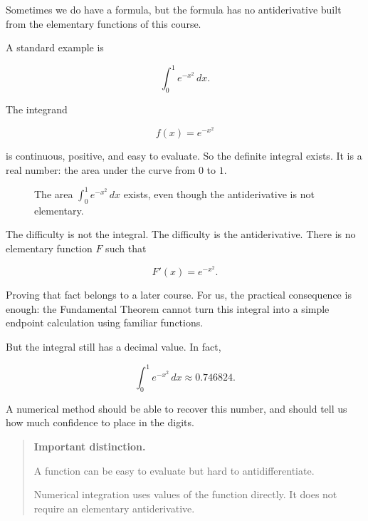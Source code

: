 Sometimes we do have a formula, but the formula has no antiderivative built from the
elementary functions of this course.

A standard example is

\[
\int_0^1 e^{-x^2}\,dx.
\]

The integrand

\[
f(x)=e^{-x^2}
\]

is continuous, positive, and easy to evaluate.  So the definite integral exists.  It is a
real number: the area under the curve from \(0\) to \(1\).

\begin{figure}[h]
\centering
{}
\caption{The area \(\int_0^1 e^{-x^2}\,dx\) exists, even though the antiderivative is not elementary.}
\label{fig:gaussian-integral-piece}
\end{figure}

The difficulty is not the integral.  The difficulty is the antiderivative.  There is no
elementary function \(F\) such that

\[
F'(x)=e^{-x^2}.
\]

Proving that fact belongs to a later course.  For us, the practical consequence is enough:
the Fundamental Theorem cannot turn this integral into a simple endpoint calculation
using familiar functions.

But the integral still has a decimal value.  In fact,

\[
\int_0^1 e^{-x^2}\,dx\approx 0.746824.
\]

A numerical method should be able to recover this number, and should tell us how much
confidence to place in the digits.

\begin{quote}
\textbf{Important distinction.}

A function can be easy to evaluate but hard to antidifferentiate.

Numerical integration uses values of the function directly.  It does not require an
elementary antiderivative.
\end{quote}

